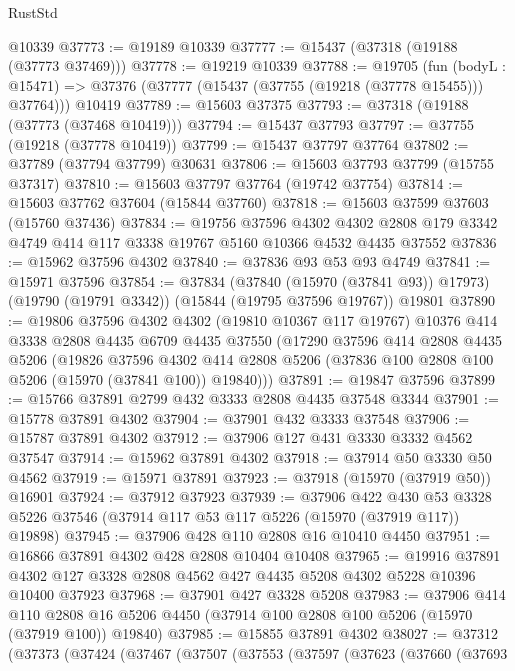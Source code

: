 \begin{lexlean}{RustStd}
\begin{coremodule}
    @10339
@37773 := @19189 @10339
@37777 := @15437 (@37318 (@19188 (@37773 @37469)))
@37778 := @19219 @10339
@37788 := @19705
    (fun (bodyL : @15471) => @37376 (@37777 (@15437 (@37755 (@19218 (@37778 @15455))) @37764)))
    @10419
@37789 := @15603 @37375
@37793 := @37318 (@19188 (@37773 (@37468 @10419)))
@37794 := @15437 @37793
@37797 := @37755 (@19218 (@37778 @10419))
@37799 := @15437 @37797 @37764
@37802 := @37789 (@37794 @37799) @30631
@37806 := @15603 @37793 @37799 (@15755 @37317)
@37810 := @15603 @37797 @37764 (@19742 @37754)
@37814 := @15603 @37762 @37604 (@15844 @37760)
@37818 := @15603 @37599 @37603 (@15760 @37436)
@37834 := @19756
    @37596
    @4302
    @4302
    @2808
    @179
    @3342
    @4749
    @414
    @117
    @3338
    @19767
    @5160
    @10366
    @4532
    @4435
    @37552
@37836 := @15962 @37596 @4302
@37840 := @37836 @93 @53 @93 @4749
@37841 := @15971 @37596
@37854 := @37834
    (@37840 (@15970 (@37841 @93)) @17973)
    (@19790 (@19791 @3342))
    (@15844 (@19795 @37596 @19767))
    @19801
@37890 := @19806
    @37596
    @4302
    @4302
    (@19810 @10367 @117 @19767)
    @10376
    @414
    @3338
    @2808
    @4435
    @6709
    @4435
    @37550
    (@17290
      @37596
      @414
      @2808
      @4435
      @5206
      (@19826
        @37596
        @4302
        @414
        @2808
        @5206
        (@37836 @100 @2808 @100 @5206 (@15970 (@37841 @100)) @19840)))
@37891 := @19847 @37596
@37899 := @15766 @37891 @2799 @432 @3333 @2808 @4435 @37548 @3344
@37901 := @15778 @37891 @4302
@37904 := @37901 @432 @3333 @37548
@37906 := @15787 @37891 @4302
@37912 := @37906 @127 @431 @3330 @3332 @4562 @37547
@37914 := @15962 @37891 @4302
@37918 := @37914 @50 @3330 @50 @4562
@37919 := @15971 @37891
@37923 := @37918 (@15970 (@37919 @50)) @16901
@37924 := @37912 @37923
@37939 := @37906
    @422
    @430
    @53
    @3328
    @5226
    @37546
    (@37914 @117 @53 @117 @5226 (@15970 (@37919 @117)) @19898)
@37945 := @37906 @428 @110 @2808 @16 @10410 @4450
@37951 := @16866 @37891 @4302 @428 @2808 @10404 @10408
@37965 := @19916
    @37891
    @4302
    @127
    @3328
    @2808
    @4562
    @427
    @4435
    @5208
    @4302
    @5228
    @10396
    @10400
    @37923
@37968 := @37901 @427 @3328 @5208
@37983 := @37906
    @414
    @110
    @2808
    @16
    @5206
    @4450
    (@37914 @100 @2808 @100 @5206 (@15970 (@37919 @100)) @19840)
@37985 := @15855 @37891 @4302
@38027 := @37312
    (@37373
      (@37424
        (@37467
          (@37507
            (@37553
              (@37597
                (@37623
                  (@37660
                    (@37693

\end{coremodule}
\end{lexlean}
